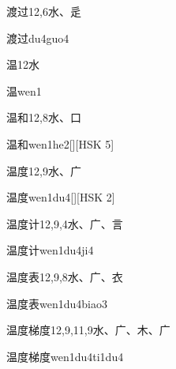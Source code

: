 \begin{Entry}{渡过}{12,6}{⽔、⾡}
  \begin{Phonetics}{渡过}{du4guo4}
  \end{Phonetics}
\end{Entry}

\begin{Entry}{温}{12}{⽔}
  \begin{Phonetics}{温}{wen1}
  \end{Phonetics}
\end{Entry}

\begin{Entry}{温和}{12,8}{⽔、⼝}
  \begin{Phonetics}{温和}{wen1he2}[][HSK 5]
  \end{Phonetics}
\end{Entry}

\begin{Entry}{温度}{12,9}{⽔、⼴}
  \begin{Phonetics}{温度}{wen1du4}[][HSK 2]
  \end{Phonetics}
\end{Entry}

\begin{Entry}{温度计}{12,9,4}{⽔、⼴、⾔}
  \begin{Phonetics}{温度计}{wen1du4ji4}
  \end{Phonetics}
\end{Entry}

\begin{Entry}{温度表}{12,9,8}{⽔、⼴、⾐}
  \begin{Phonetics}{温度表}{wen1du4biao3}
  \end{Phonetics}
\end{Entry}

\begin{Entry}{温度梯度}{12,9,11,9}{⽔、⼴、⽊、⼴}
  \begin{Phonetics}{温度梯度}{wen1du4ti1du4}
  \end{Phonetics}
\end{Entry}

